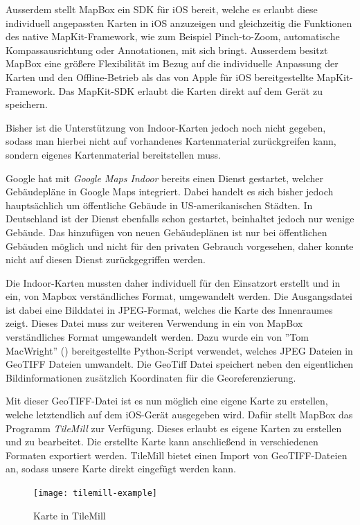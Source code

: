 Ausserdem stellt MapBox ein SDK für iOS bereit, welche es erlaubt diese individuell angepassten Karten in iOS anzuzeigen und gleichzeitig die Funktionen des native MapKit-Framework, wie zum Beispiel Pinch-to-Zoom, automatische Kompassausrichtung oder Annotationen, mit sich bringt. Ausserdem besitzt MapBox eine größere Flexibilität im Bezug auf die individuelle Anpassung der Karten und den Offline-Betrieb als das von Apple für iOS bereitgestellte MapKit-Framework. Das MapKit-SDK erlaubt die Karten direkt auf dem Gerät zu speichern.

Bisher ist die Unterstützung von Indoor-Karten jedoch noch nicht gegeben, sodass man hierbei nicht auf vorhandenes Kartenmaterial zurückgreifen kann, sondern eigenes Kartenmaterial bereitstellen muss.

Google hat mit \emph{Google Maps Indoor} bereits einen Dienst gestartet, welcher Gebäudepläne in Google Maps integriert. Dabei handelt es sich bisher jedoch hauptsächlich um öffentliche Gebäude in US-amerikanischen Städten. In Deutschland ist der Dienst ebenfalls schon gestartet, beinhaltet jedoch nur wenige Gebäude. Das hinzufügen von neuen Gebäudeplänen ist nur bei öffentlichen Gebäuden möglich und nicht für den privaten Gebrauch vorgesehen, daher konnte nicht auf diesen Dienst zurückgegriffen werden.

Die Indoor-Karten mussten daher individuell für den Einsatzort erstellt und in ein, von Mapbox verständliches Format, umgewandelt werden.
Die Ausgangsdatei ist dabei eine Bilddatei in JPEG-Format, welches die Karte des Innenraumes zeigt. Dieses Datei muss zur weiteren Verwendung in ein von MapBox verständliches Format umgewandelt werden. 
Dazu wurde ein von ''Tom MacWright'' (\citet{jpgtogeo}) bereitgestellte Python-Script verwendet, welches JPEG Dateien in GeoTIFF Dateien umwandelt. Die GeoTiff Datei speichert neben den eigentlichen Bildinformationen zusätzlich Koordinaten für die Georeferenzierung. \citet{geotiff}

Mit dieser GeoTIFF-Datei ist es nun möglich eine eigene Karte zu erstellen, welche letztendlich auf dem iOS-Gerät ausgegeben wird.
Dafür stellt MapBox das Programm \emph{TileMill} zur Verfügung. Dieses erlaubt es eigene Karten zu erstellen und zu bearbeitet. Die erstellte Karte kann anschließend in verschiedenen Formaten exportiert werden. 
TileMill bietet einen Import von GeoTIFF-Dateien an, sodass unsere Karte direkt eingefügt werden kann.

\begin{figure}[htb!]
	\centering
	\texttt{[image: tilemill-example]}
	\caption{Karte in TileMill}
	\label{tilemill-example}
\end{figure}

